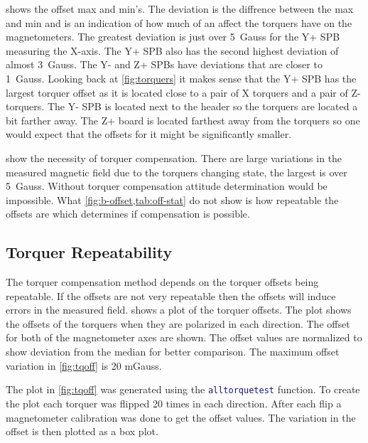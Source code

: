 shows the offset max and min's. The deviation is the diffrence between the max and min and is an indication of how much of an affect the torquers have on the magnetometers. The greatest deviation is just over 5~Gauss for the Y+ \ac{SPB} measuring the X-axis. The Y+ \ac{SPB} also has the second highest deviation of almost 3~Gauss. The Y- and Z+ \acp{SPB} have deviations that are closer to 1~Gauss. Looking back at \cref{fig:torquers} it makes sense that the Y+ \ac{SPB} has the largest torquer offset as it is located close to a pair of X torquers and a pair of Z-torquers. The Y- \ac{SPB} is located next to the header so the torquers are located a bit farther away. The Z+ board is located farthest away from the torquers so one would expect that the offsets for it might be significantly smaller.


 show the necessity of torquer compensation. There are large variations in the measured magnetic field due to the torquers changing state, the largest is over 5~Gauss. Without torquer compensation attitude determination would be impossible. What \cref{fig:b-offset,tab:off-stat} do not show is how repeatable the offsets are which determines if compensation is possible.

\subsection{Torquer Repeatability}

The torquer compensation method depends on the torquer offsets being repeatable. If the offsets are not very repeatable then the offsets will induce errors in the measured field.  shows a plot of the torquer offsets. The plot shows the offsets of the torquers when they are polarized in each direction. The offset for both of the magnetometer axes are shown. The offset values are normalized to show deviation from the median for better comparison. The maximum offset variation in \cref{fig:tqoff} is 20 mGauss.

The plot in \cref{fig:tqoff} was generated using the \lstinline[style=code,language=Matlab]$alltorquetest$ function. To create the plot each torquer was flipped 20 times in each direction. After each flip a magnetometer calibration was done to get the offset values. The variation in the offset is then plotted as a box plot.


